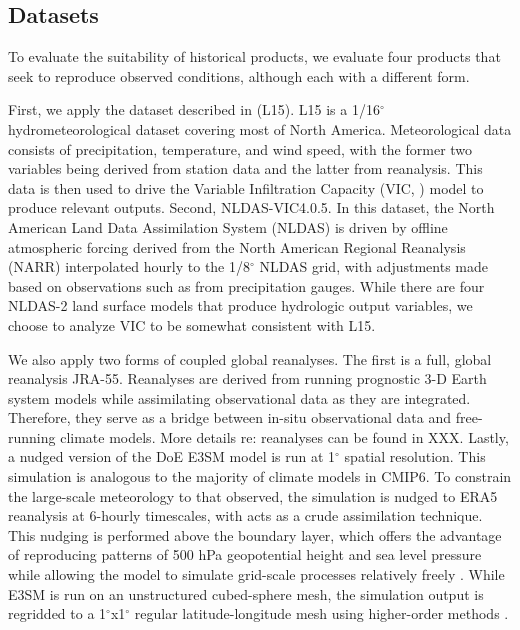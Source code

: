 \documentclass[draft]{agujournal2019}
\newcommand{\degree}{$^{\circ}$}
\begin{document}
\subsection{Datasets}


To evaluate the suitability of historical products, we evaluate four products that seek to reproduce observed conditions, although each with a different form.


First, we apply the dataset described in \citet{livneh2015spatially} (L15). L15 is a 1/16\degree{} hydrometeorological dataset covering most of North America. Meteorological data consists of precipitation, temperature, and wind speed, with the former two variables being derived from station data and the latter from reanalysis. This data is then used to drive the Variable Infiltration Capacity (VIC, \citet{liang1994simple}) model to produce relevant outputs. Second, NLDAS-VIC4.0.5. In this dataset, the North American Land Data Assimilation System (NLDAS) is driven by offline atmospheric forcing derived from the North American Regional Reanalysis (NARR) interpolated hourly to the 1/8\degree{} NLDAS grid, with adjustments made based on observations such as from precipitation gauges. While there are four NLDAS-2 land surface models that produce hydrologic output variables, we choose to analyze VIC to be somewhat consistent with L15.

We also apply two forms of coupled global reanalyses. The first is a full, global reanalysis JRA-55. Reanalyses are derived from running prognostic 3-D Earth system models while assimilating observational data as they are integrated. Therefore, they serve as a bridge between in-situ observational data and free-running climate models. More details re: reanalyses can be found in XXX. Lastly, a nudged version of the DoE E3SM model is run at 1\degree{} spatial resolution. This simulation is analogous to the majority of climate models in CMIP6. To constrain the large-scale meteorology to that observed, the simulation is nudged to ERA5 reanalysis at 6-hourly timescales, with acts as a crude assimilation technique. This nudging is performed above the boundary layer, which offers the advantage of reproducing patterns of 500 hPa geopotential height and sea level pressure while allowing the model to simulate grid-scale processes relatively freely \citep{sun2019impact}. While E3SM is run on an unstructured cubed-sphere mesh, the simulation output is regridded to a 1\degree{}x1\degree{} regular latitude-longitude mesh using higher-order methods \citep{hill2004architecture}. 
\end{document}

